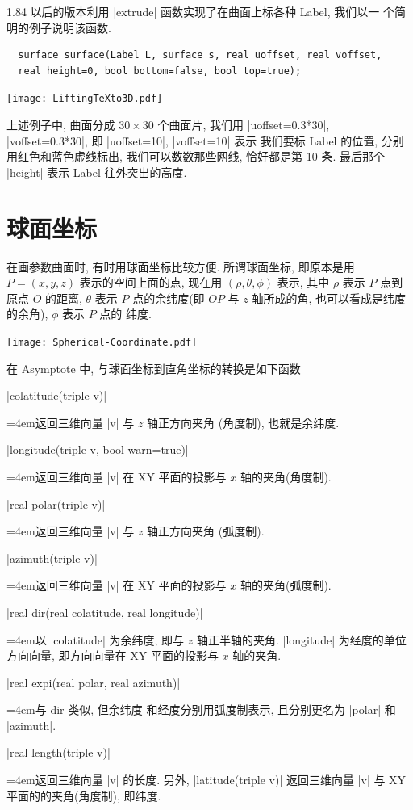 \documentclass[nofonts,CJKnormalspaces]{ctexbook}
\newenvironment{funclist}{\trivlist
  \parindent=0pt
\item[]
  \def\item{\medskip\par\leftskip=0pt}
  \def\go{\par\leftskip=4em}}
{\endtrivlist}
\begin{document}
1.84 以后的版本利用 |extrude| 函数实现了在曲面上标各种 Label, 我们以一
个简明的例子说明该函数.
\begin{lstlisting}
  surface surface(Label L, surface s, real uoffset, real voffset,
  real height=0, bool bottom=false, bool top=true);
\end{lstlisting}
\begin{center}\texttt{[image: LiftingTeXto3D.pdf]}\end{center}%

上述例子中, 曲面分成 $30\times 30$ 个曲面片, 我们用
|uoffset=0.3*30|, |voffset=0.3*30|, 即 |uoffset=10|, |voffset=10| 表示
我们要标 Label 的位置, 分别用红色和蓝色虚线标出, 我们可以数数那些网线,
恰好都是第 10 条. 最后那个 |height| 表示 Label 往外突出的高度.

\section{球面坐标}
在画参数曲面时, 有时用球面坐标比较方便. 所谓球面坐标, 即原本是用
$P=(x,y,z)$ 表示的空间上面的点, 现在用 $(\rho,\theta,\phi)$ 表示, 其中
$\rho$ 表示 $P$ 点到原点 $O$ 的距离, $\theta$ 表示 $P$ 点的余纬度(即
$OP$ 与 $z$ 轴所成的角, 也可以看成是纬度的余角), $\phi$ 表示 $P$ 点的
纬度.
\begin{center}\texttt{[image: Spherical-Coordinate.pdf]}\end{center}%

在 Asymptote 中, 与球面坐标到直角坐标的转换是如下函数
\begin{funclist}
\item |colatitude(triple v)| \go 返回三维向量 |v| 与 $z$ 轴正方向夹角
  (角度制), 也就是余纬度.
\item |longitude(triple v, bool warn=true)| \go 返回三维向量 |v| 在 XY
  平面的投影与 $x$ 轴的夹角(角度制).
\item |real polar(triple v)| \go 返回三维向量 |v| 与 $z$ 轴正方向夹角
  (弧度制).
\item |azimuth(triple v)| \go 返回三维向量 |v| 在 XY 平面的投影与 $x$
  轴的夹角(弧度制).
\item |real dir(real colatitude, real longitude)| \go 以 |colatitude|
  为余纬度, 即与 $z$ 轴正半轴的夹角. |longitude| 为经度的单位方向向量,
  即方向向量在 XY 平面的投影与 $x$ 轴的夹角.
\item |real expi(real polar, real azimuth)| \go 与 dir 类似, 但余纬度
  和经度分别用弧度制表示, 且分别更名为 |polar| 和 |azimuth|.
\item |real length(triple v)| \go 返回三维向量 |v| 的长度.
\end{funclist}
另外, |latitude(triple v)| 返回三维向量 |v| 与 XY 平面的的夹角(角度制),
即纬度.
\end{document}
